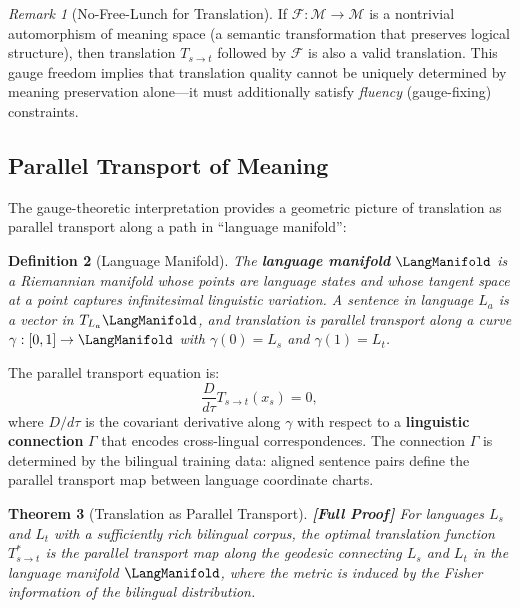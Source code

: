 \documentclass[12pt,a4paper]{article}
\newtheorem{theorem}{Theorem}[section]
\newtheorem{definition}[theorem]{Definition}
\theoremstyle{remark}
\newtheorem{remark}[theorem]{Remark}
\newcommand{\M}{\mathcal{M}}
\newcommand{\rigorFull}{\textbf{[Full Proof]}}
\begin{document}
\begin{remark}[No-Free-Lunch for Translation]
\label{rem:nfl_translation}
If $\mathcal{F}: \M \to \M$ is a nontrivial automorphism of meaning
space (a semantic transformation that preserves logical structure),
then translation $T_{s\to t}$ followed by $\mathcal{F}$ is also a
valid translation. This gauge freedom implies that translation quality
cannot be uniquely determined by meaning preservation alone---it must
additionally satisfy \emph{fluency} (gauge-fixing) constraints.
\end{remark}

\subsection{Parallel Transport of Meaning}

The gauge-theoretic interpretation provides a geometric picture of
translation as parallel transport along a path in ``language manifold'':

\begin{definition}[Language Manifold]
\label{def:language_manifold}
The \textbf{language manifold} $\LangManifold$ is a Riemannian manifold
whose points are language states and whose tangent space at a point
captures infinitesimal linguistic variation. A sentence in language
$L_a$ is a vector in $T_{L_a}\LangManifold$, and translation is
parallel transport along a curve $\gamma: [0,1] \to \LangManifold$
with $\gamma(0) = L_s$ and $\gamma(1) = L_t$.
\end{definition}

The parallel transport equation is:
\begin{equation}
  \label{eq:parallel_transport}
  \frac{D}{d\tau} T_{s\to t}(x_s) = 0,
\end{equation}
where $D/d\tau$ is the covariant derivative along $\gamma$ with
respect to a \textbf{linguistic connection} $\Gamma$ that encodes
cross-lingual correspondences. The connection $\Gamma$ is determined
by the bilingual training data: aligned sentence pairs define the
parallel transport map between language coordinate charts.

\begin{theorem}[Translation as Parallel Transport]
\label{thm:parallel_transport}
\rigorFull
For languages $L_s$ and $L_t$ with a sufficiently rich bilingual
corpus, the optimal translation function $T_{s\to t}^*$ is the
parallel transport map along the geodesic connecting $L_s$ and
$L_t$ in the language manifold $\LangManifold$, where the metric
is induced by the Fisher information of the bilingual distribution.
\end{theorem}
\end{document}
